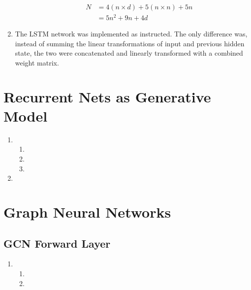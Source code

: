 \documentclass{article}
\begin{document}
\begin{enumerate}[label=\textbf{1.\arabic*}]
\begin{enumerate}[label=\textbf{(\alph*)}]
    \begin{align*}
      N &= 4 (n \times d) + 5 (n \times n) + 5 n \\
      &= 5n^2 + 9n + 4d
    \end{align*}

  \end{enumerate}

  \item
  The LSTM network was implemented as instructed. The only difference was, instead of summing the linear transformations of input and previous hidden state, the two were concatenated and linearly transformed with a combined weight matrix.


\end{enumerate}

\section{Recurrent Nets as Generative Model}

\begin{enumerate}[label=\textbf{2.\arabic*}]
  \item

  \begin{enumerate}[label=\textbf{(\alph*)}]
    \item
    \item
    \item
  \end{enumerate}

  \item
\end{enumerate}

\section{Graph Neural Networks}

\subsection{GCN Forward Layer}

\begin{enumerate}[label=\textbf{3.\arabic*}]
  \item

  \begin{enumerate}[label=\textbf{(\alph*)}]
    \item
    \item
  \end{enumerate}
\end{enumerate}
\end{document}
